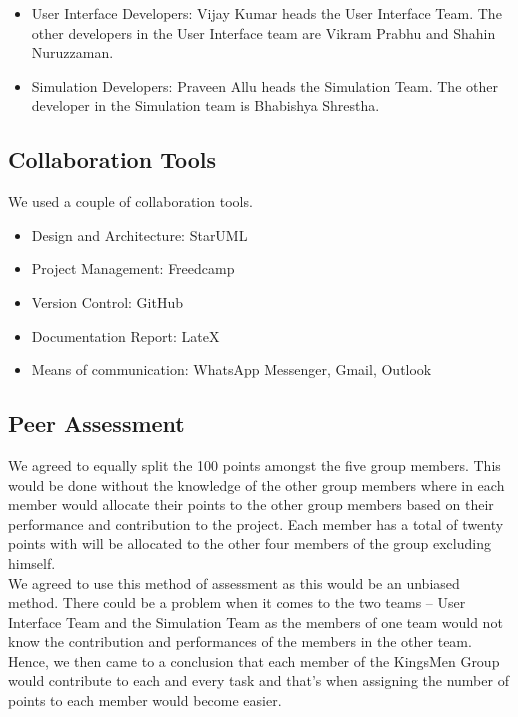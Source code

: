 \documentclass[11pt]{article}
\begin{document}
\begin{itemize}
\item User Interface Developers: Vijay Kumar heads the User Interface Team. The other developers in the User Interface team are Vikram Prabhu and Shahin Nuruzzaman.
\end{itemize}

\begin{itemize}
\item Simulation Developers: Praveen Allu heads the Simulation Team. The other developer in the Simulation team is Bhabishya Shrestha.
\end{itemize}

\subsection{Collaboration Tools}

We used a couple of collaboration tools.


\begin{itemize}
\item Design and Architecture: StarUML
\end{itemize}

\begin{itemize}
\item Project Management: Freedcamp
\end{itemize}
 

\begin{itemize}
\item Version Control: GitHub
\end{itemize}

\begin{itemize}
\item Documentation Report: LateX
\end{itemize}

\begin{itemize}
\item Means of communication: WhatsApp Messenger, Gmail, Outlook
\end{itemize}

\subsection{Peer Assessment}

We agreed to equally split the 100 points amongst the five group members. This would be done without the knowledge of the other group members where in each member would allocate their points to the other group members based on their performance and contribution to the project. Each member has a total of twenty points with will be allocated to the other four members of the group excluding himself.\\
We agreed to use this method of assessment as this would be an unbiased method. There could be a problem when it comes to the two teams -- User Interface Team and the Simulation Team as the members of one team would not know the contribution and performances of the members in the other team. Hence, we then came to a conclusion that each member of the KingsMen Group would contribute to each and every task and that’s when assigning the number of points to each member would become easier.
\end{document}

